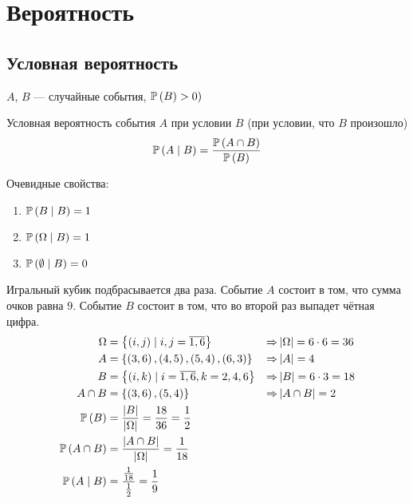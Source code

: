 \chapter{Вероятность}

\section{Условная вероятность}
$A$, $B$ --- случайные события, $\mathbb{P}\left( B \right)>0)$
\begin{definition}
    Условная вероятность события $A$ при условии $B$
    (при условии, что $B$ произошло)
    $$\mathbb{P}\left( A\mid B \right)
    =\frac{\mathbb{P}\left(A\cap B\right)}{\mathbb{P}\left( B \right)}$$
\end{definition}
Очевидные свойства:
\begin{enumerate}
    \item $\mathbb{P}\left( B\mid B \right)=1$
    \item $\mathbb{P}\left( \Omega\mid B \right)=1$
    \item $\mathbb{P}\left( \emptyset\mid B \right)=0$
\end{enumerate}

\begin{example}Игральный кубик подбрасывается два раза.
    Событие $A$ состоит в том, что сумма очков равна $9$.
    Событие $B$ состоит в том, что во второй раз выпадет чётная цифра.
    \begin{alignat*}{3}
        \Omega&=\left\{\left(i,j\right)\mid i,j=\overline{1,6}\right\}
        &\Rightarrow&\left|\Omega\right|=6\cdot 6=36\\
        A&=\left\{\left(3,6\right),\left(4,5\right),\left(5,4\right),
            \left(6,3\right)\right\}
        &\Rightarrow&\left|A\right|=4\\
        B&=\left\{\left(i,k\right)\mid i=\overline{1,6}, k=2,4,6\right\}
        &\Rightarrow&\left|B\right|=6\cdot 3=18\\
        A\cap B&=\left\{\left(3,6\right), \left(5,4\right)\right\}
        &\Rightarrow&\left|A\cap B\right|=2\\
        \mathbb{P}\left( B \right)&=\frac{\left|B\right|}{\left|\Omega\right|}
            =\frac{18}{36}=\frac{1}{2}\\
        \mathbb{P}\left( A\cap B \right)&=\frac{\left|A\cap B\right|}{\left|\Omega\right|}
            =\frac{1}{18}\\
        \mathbb{P}\left( A\mid B \right)&=\frac{\frac{1}{18}}{\frac{1}{2}}=\frac{1}{9}\\
    \end{alignat*}

\end{example}
